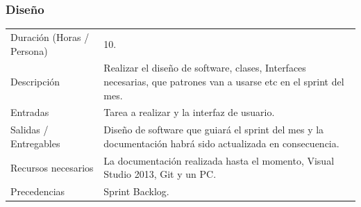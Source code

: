 \subsubsection{Dise\~{n}o}
\begin{table}[H]
    \begin{center}
        \begin{tabular}{l p{8cm}}
            Duraci\'{o}n (Horas / Persona)        & 10. \\ 
            Descripci\'{o}n                       & Realizar el diseño de software, clases, Interfaces necesarias, que patrones van a usarse etc 
                                                    en el sprint del mes. \\
            Entradas                              & Tarea a realizar y la interfaz de usuario.\\
            Salidas / Entregables                 & Dise\~{n}o de software que guiar\'{a} el sprint del mes y la documentaci\'{o}n
                                                    habr\'{a} sido actualizada en consecuencia. \\
            Recursos necesarios                   & La documentaci\'{o}n realizada hasta el momento, Visual Studio 2013, Git y 	un 
            										PC. \\
            Precedencias                          & Sprint Backlog. \\
        \end{tabular}
    \end{center}
    
\end{table}

\clearpage

